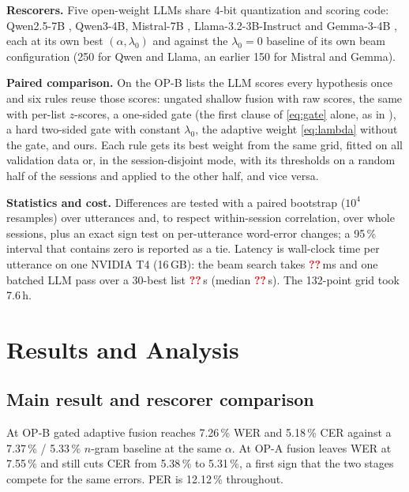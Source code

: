 \documentclass[conference,a4paper,10pt]{IEEEtran}
\newcommand{\pct}{\,\%}
\newcommand{\RvPend}{\textcolor{red}{\textbf{??}}}
\newcommand{\RvTdec}{\RvPend}
\newcommand{\RvTllm}{\RvPend}
\newcommand{\RvTllmMed}{\RvPend}
\begin{document}
\textbf{Rescorers.} Five open-weight LLMs share 4-bit quantization and scoring
code: Qwen2.5-7B \cite{qwen2024qwen25}, Qwen3-4B, Mistral-7B
\cite{jiang2023mistral}, Llama-3.2-3B-Instruct \cite{grattafiori2024llama3}
and Gemma-3-4B \cite{gemma2025gemma3}, each at its own best
$(\alpha,\lambda_0)$ and against the $\lambda_0{=}0$ baseline of its own beam
configuration (250 for Qwen and Llama, an earlier 150 for Mistral and Gemma).

\textbf{Paired comparison.} On the OP-B lists the LLM scores every hypothesis
once and six rules reuse those scores:
ungated shallow fusion with raw scores, the same with per-list $z$-scores, a
one-sided gate (the first clause of \eqref{eq:gate} alone, as in
\cite{cheng2026kaggle7}), a hard two-sided gate with constant $\lambda_0$, the
adaptive weight \eqref{eq:lambda} without the gate, and ours. Each rule gets its
best weight from the same grid, fitted on all validation data or, in the
session-disjoint mode, with its thresholds on a random half of the sessions and
applied to the other half, and vice versa.

\textbf{Statistics and cost.} Differences are tested with a paired bootstrap
\cite{bisani2004bootstrap} ($10^4$ resamples) over utterances and, to respect
within-session correlation, over whole sessions, plus an exact sign test on
per-utterance word-error changes; a 95\pct{} interval that contains zero is
reported as a tie. Latency is wall-clock time per utterance on one NVIDIA T4
(16\,GB): the beam search takes \RvTdec\,ms and one batched LLM pass over a 30-best
list \RvTllm\,s (median \RvTllmMed\,s). The 132-point grid took 7.6\,h.


\section{Results and Analysis}\label{sec:results}

\subsection{Main result and rescorer comparison}
At OP-B gated adaptive fusion reaches 7.26\pct{} WER and
5.18\pct{} CER against a 7.37\pct{} / 5.33\pct{} $n$-gram baseline at the same
$\alpha$. At OP-A fusion leaves
WER at 7.55\pct{} and still cuts CER from 5.38\pct{} to 5.31\pct{}, a first sign
that the two stages compete for the same errors. PER is 12.12\pct{} throughout.
\end{document}
